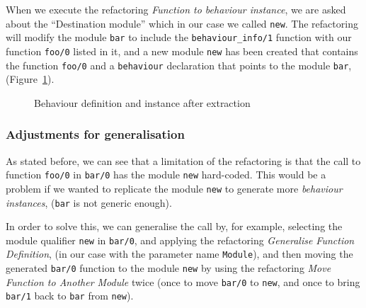 When we execute the refactoring \emph{Function to behaviour instance},
we are asked about the ``Destination module'' which in our case
we called \texttt{new}. The refactoring will modify the module \texttt{bar}
to include the \texttt{behaviour\_info/1} function with our function
\texttt{foo/0} listed in it, and a new module \texttt{new} has been
created that contains the function \texttt{foo/0} and a \texttt{behaviour}
declaration that points to the module \texttt{bar}, (Figure~\ref{fig:after_ref}).

\begin{figure}
\begin{minipage}[t]{0.65\columnwidth}%
%
\end{minipage}%
\begin{minipage}[t]{0.35\columnwidth}%
%
\end{minipage}

\caption{Behaviour definition and instance after extraction\label{fig:after_ref}}
\end{figure}



\subsubsection{Adjustments for generalisation\label{sub:adjustments-for-generalisation}}

As stated before, we can see that a limitation of the refactoring
is that the call to function \texttt{foo/0} in \texttt{bar/0} has
the module \texttt{new} hard-coded. This would be a problem if we
wanted to replicate the module \texttt{new} to generate more \emph{behaviour
instances}, (\texttt{bar} is not generic enough).

In order to solve this, we can generalise the call by, for example,
selecting the module qualifier \texttt{new} in \texttt{bar/0}, and
applying the refactoring \emph{Generalise Function Definition}, (in
our case with the parameter name \texttt{Module}), and then moving
the generated \texttt{bar/0} function to the module \texttt{new} by
using the refactoring \emph{Move Function to Another Module} twice
(once to move \texttt{bar/0} to \texttt{new}, and once to bring \texttt{bar/1}
back to \texttt{bar} from \texttt{new}).

